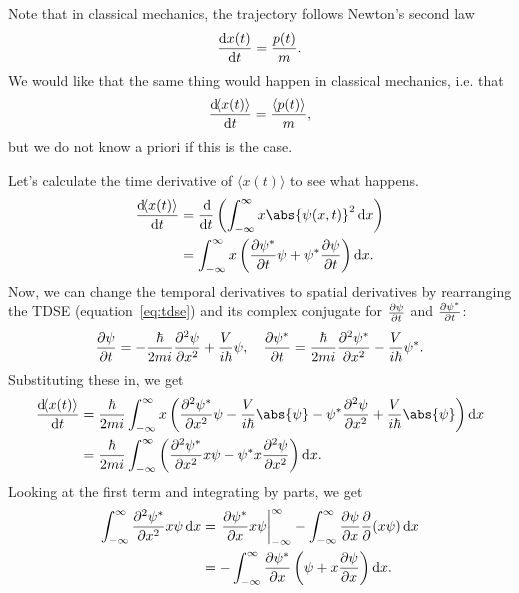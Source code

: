 \documentclass[../quantum_mechanics.tex]{subfiles}
\begin{document}
            Note that in classical mechanics, the trajectory follows Newton's second law
            \begin{equation}
                \dv{x(t)}{t}=\frac{p(t)}{m}.
            \end{equation}
            We would like that the same thing would happen in classical mechanics, i.e. that
            \begin{equation}\label{eq:newton-II-quantum}
                \dv{\langle x(t)\rangle}{t}=\frac{\langle p(t)\rangle}{m},
            \end{equation}
            but we do not know a priori if this is the case.

            Let's calculate the time derivative of $\langle x(t)\rangle$ to see what happens.
            \begin{align}
                \dv{\langle x(t)\rangle}{t}&=\dv{}{t}\left(\int_{-\infty}^\infty x\abs{\psi(x,t)}^2\dd{x}\right)\\
                &=\int_{-\infty}^\infty x\left(\pdv{\psi^\ast}{t}\psi+\psi^\ast\pdv{\psi}{t}\right)\dd{x}.
            \end{align}
            Now, we can change the temporal derivatives to spatial derivatives by rearranging the TDSE (equation~\ref{eq:tdse}) and its complex conjugate for $\pdv{\psi}{t}$ and $\pdv{\psi^\ast}{t}$:
            \begin{equation}\label{eq:tdse-time-derivative-substitution}
                \pdv{\psi}{t}=-\frac{\hbar}{2mi}\pdv[2]{\psi}{x}+\frac{V}{i\hbar}\psi,\quad\pdv{\psi^\ast}{t}=\frac{\hbar}{2mi}\pdv[2]{\psi^\ast}{x}-\frac{V}{i\hbar}\psi^\ast.
            \end{equation}
            Substituting these in, we get
            \begin{align}
                \dv{\langle x(t)\rangle}{t}&=\frac{\hbar}{2mi}\int_{-\infty}^\infty x\left(\pdv[2]{\psi^\ast}{x}\psi-\frac{V}{i\hbar}\abs{\psi}-\psi^\ast\pdv[2]{\psi}{x}+\frac{V}{i\hbar}\abs{\psi}\right)\dd{x}\\
                &=\frac{\hbar}{2mi}\int_{-\infty}^\infty\left(\pdv[2]{\psi^\ast}{x}x\psi-\psi^\ast x\pdv[2]{\psi}{x}\right)\dd{x}.
            \end{align}
            Looking at the first term and integrating by parts, we get
            \begin{align}
                \int_{-\infty}^\infty\pdv[2]{\psi^\ast}{x}x\psi\dd{x}&=\left.\pdv{\psi^\ast}{x}x\psi\right|_{-\infty}^\infty-\int_{-\infty}^\infty\pdv{\psi}{x}\pdv{}{}(x\psi)\dd{x}\\
                &=-\int_{-\infty}^\infty\pdv{\psi^\ast}{x}\left(\psi+x\pdv{\psi}{x}\right)\dd{x}.
            \end{align}
\end{document}
